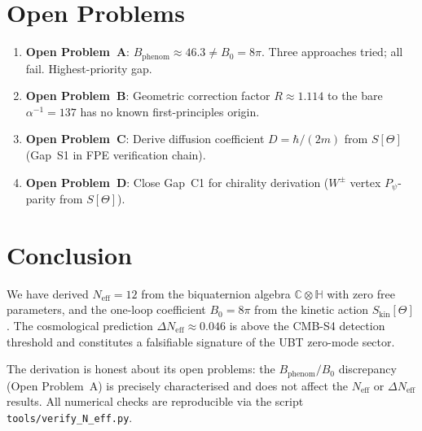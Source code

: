 \documentclass[12pt,a4paper]{article}
\theoremstyle{definition}
\theoremstyle{remark}
\newcommand{\C}{\mathbb{C}}
\renewcommand{\H}{\mathbb{H}}
\begin{document}
\section{Open Problems}
\label{sec:open_problems}

\begin{enumerate}
  \item \textbf{Open Problem~A}: $B_{\mathrm{phenom}} \approx 46.3 \neq B_0 = 8\pi$.
    Three approaches tried; all fail.  Highest-priority gap.

  \item \textbf{Open Problem~B}: Geometric correction factor $R \approx 1.114$
    to the bare $\alpha^{-1} = 137$ has no known first-principles origin.

  \item \textbf{Open Problem~C}: Derive diffusion coefficient $D = \hbar/(2m)$
    from $S[\Theta]$ (Gap~S1 in FPE verification chain).

  \item \textbf{Open Problem~D}: Close Gap~C1 for chirality derivation
    ($W^\pm$ vertex $P_\psi$-parity from $S[\Theta]$).
\end{enumerate}

\section{Conclusion}
\label{sec:conclusion}

We have derived $N_{\mathrm{eff}} = 12$ from the biquaternion algebra
$\C\otimes\H$ with zero free parameters, and the one-loop coefficient
$B_0 = 8\pi$ from the kinetic action $S_{\mathrm{kin}}[\Theta]$.
The cosmological prediction $\Delta N_{\mathrm{eff}} \approx 0.046$
is above the CMB-S4 detection threshold and constitutes a falsifiable
signature of the UBT zero-mode sector.

The derivation is honest about its open problems: the
$B_{\mathrm{phenom}}/B_0$ discrepancy (Open Problem~A) is precisely
characterised and does not affect the $N_{\mathrm{eff}}$ or
$\Delta N_{\mathrm{eff}}$ results.  All numerical checks are reproducible
via the script \texttt{tools/verify\_N\_eff.py}.
\end{document}
